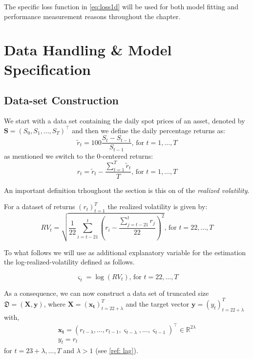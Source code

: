 \documentclass[a4paper, oneside]{discothesis}
\begin{document}
 \begin{mdframed}\begin{remark}
The specific loss function in \ref{eq:loss1d} will be used for both model fitting and performance measurement reasons throughout the chapter. 
\end{remark}\end{mdframed}       
\section{Data Handling \& Model Specification}
\subsection{Data-set Construction}
We start with a data set containing the daily spot prices of an asset, denoted by $\mathbf{S} = (S_0, S_1, \dots, S_T)^\intercal$ and then we define the daily percentage returns as:
\begin{equation}
    \tilde{r}_{t} = 100\frac{S_{t}-S_{t-1}}{S_{t-1}} \text{,  for } t = 1, \dots, T 
\end{equation}
as mentioned we switch to the 0-centered returns:
\begin{equation}
    r_t = \tilde{r}_t - \frac{\sum_{t = 1}^{T}\tilde{r}_t}{T} \text{,  for } t = 1, \dots, T 
\end{equation}

An important definition trhoughout the section is this on of the \textit{realized volatility}.

\begin{definition}
For a dataset of returns $(r_t)_{t = 1}^T$ the realized volatility is given by:
\begin{equation}
    RV_t = \sqrt{\frac{1}{22}\sum_{i = t-21}^{t} \left(r_i - \frac{\sum_{j=t-21}^{t} r_j}{22}\right)^2}\text{,  for } t = 22, \dots, T 
\end{equation}
\end{definition}

To what follows we will use as additional explanatory variable for the estimation the log-realized-volatility defined as follows. 

\begin{equation}\label{eq:rv}
    \varsigma_t = \log\left(RV_t\right)\text{,  for } t = 22, \dots, T 
\end{equation}

As a consequence, we can now construct a data set of truncated size $\mathfrak{D} = \left(\mathbf{X}, \mathbf{y}\right)$, where $\mathbf{X} = (\mathbf{x_t})_{t=22+\lambda}^T$ and the target vector $\mathbf{y} = (y_t)_{t = 22+\lambda}^T$ with, 
\begin{gather}\label{data_shape}
    \mathbf{x_t} = (r_{t-\lambda}, \dots, r_{t-1}, \varsigma_{t-\lambda},\dots, \varsigma_{t-1})^\intercal\in\mathbb{R}^{2\lambda}\\
    y_t = r_t
\end{gather}
 for $ t = 23+\lambda, \dots, T$ and $\lambda>1$ (see \ref{ref: lag}).
 
\end{document}
